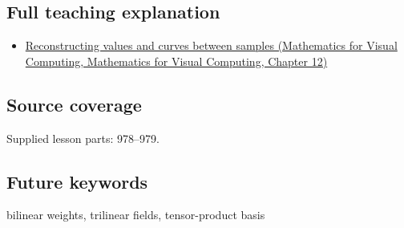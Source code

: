 \subsection{Full teaching explanation}\label{appendix-0a09b6dfdc86-full-teaching-explanation}

\begin{itemize}
\tightlist
\item
  \href{../02-Mathematics-for-Visual-Computing/main.pdf\#nameddest=02-foundations-ii-ch028-reconstructing-values-and-curves-between-samples}{Reconstructing values and curves between samples (Mathematics for Visual Computing, Mathematics for Visual Computing, Chapter 12)}
\end{itemize}

\subsection{Source coverage}\label{appendix-0a09b6dfdc86-source-coverage}

Supplied lesson parts: 978--979.

\subsection{Future keywords}\label{appendix-0a09b6dfdc86-future-keywords}

bilinear weights, trilinear fields, tensor-product basis
